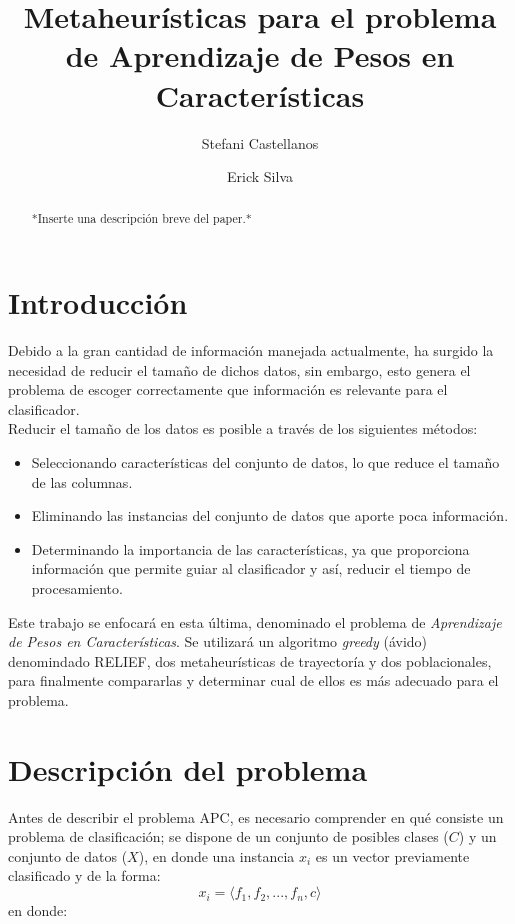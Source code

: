 \documentclass{ci5652}
\title{Metaheurísticas para el problema de Aprendizaje de Pesos en Características}
\author{Stefani Castellanos
        \and
        Erick Silva}
\begin{document}
\maketitle

\begin{abstract}
*Inserte una descripción breve del paper.*
\end{abstract}

\section*{Introducción}
Debido a la gran cantidad de información manejada actualmente, ha surgido la
necesidad de reducir el tamaño de dichos datos, sin embargo, esto genera el
problema de escoger correctamente que información es relevante para el
clasificador.\cite{Cano_2003} \\

Reducir el tamaño de los datos es posible a través de los siguientes métodos:

\begin{itemize}
  \item Seleccionando características del conjunto de datos, lo que reduce el
  tamaño de las columnas.
  \item Eliminando las instancias del conjunto de datos que aporte poca
  información.
  \item Determinando la importancia de las características, ya que proporciona
  información que permite guiar al clasificador y así, reducir el tiempo de
  procesamiento.
\end{itemize}

Este trabajo se enfocará en esta última, denominado el problema de \textit{Aprendizaje
de Pesos en Características}. Se utilizará un algoritmo \textit{greedy} (ávido)
denomindado RELIEF, dos metaheurísticas de trayectoría y dos poblacionales,
para finalmente compararlas y determinar cual de ellos es más adecuado para el
problema.


\section{Descripción del problema}

Antes de describir el problema APC, es necesario comprender en qué consiste
un problema de clasificación; se dispone de un conjunto de posibles clases
($C$) y un conjunto de datos ($X$), en donde una instancia $x_i$ es un vector
previamente clasificado y de la forma:
$$x_i = \langle f_1, f_2, ..., f_n, c\rangle $$ en donde:
\end{document}
